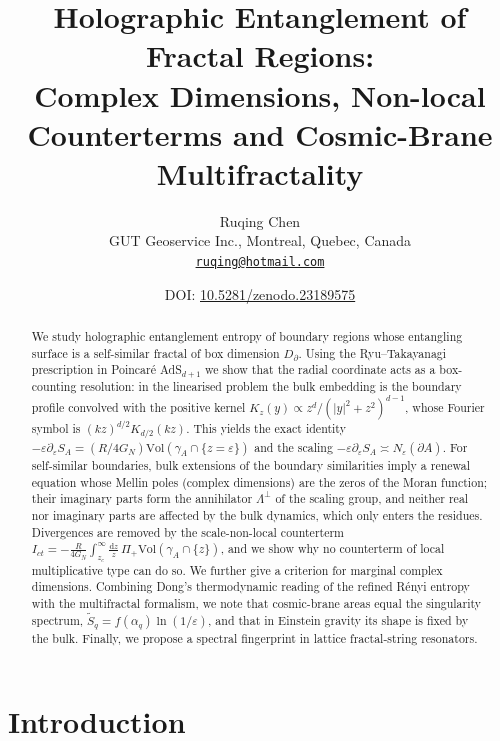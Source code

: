 \documentclass[11pt]{article}
\title{Holographic Entanglement of Fractal Regions:\\
Complex Dimensions, Non-local Counterterms and Cosmic-Brane Multifractality}
\author{Ruqing Chen\\[2pt]
\small GUT Geoservice Inc., Montreal, Quebec, Canada\\
\small \href{mailto:ruqing@hotmail.com}{\texttt{ruqing@hotmail.com}}}
\date{\small DOI: \href{https://doi.org/10.5281/zenodo.23189575}{10.5281/zenodo.23189575}}
\theoremstyle{definition}\newtheorem{definition}{Definition}[section]
\theoremstyle{remark}\newtheorem*{remark}{Remark}
\newcommand{\dd}{\mathrm{d}}
\newcommand{\Vol}{\mathrm{Vol}}
\newcommand{\GN}{G_N}
\begin{document}
\maketitle

\begin{abstract}
We study holographic entanglement entropy of boundary regions whose entangling surface is a
self-similar fractal of box dimension $D_\partial$. Using the Ryu--Takayanagi prescription in Poincar\'e
AdS$_{d+1}$ we show that the radial coordinate acts as a box-counting resolution: in the linearised
problem the bulk embedding is the boundary profile convolved with the positive kernel
$K_z(y)\propto z^d/(|y|^2+z^2)^{d-1}$, whose Fourier symbol is $(kz)^{d/2}K_{d/2}(kz)$. This yields the exact
identity $-\varepsilon\partial_\varepsilon S_A=(R/4\GN)\Vol(\gamma_A\cap\{z=\varepsilon\})$ and the scaling
$-\varepsilon\partial_\varepsilon S_A\asymp N_\varepsilon(\partial A)$.
For self-similar boundaries, bulk extensions of the boundary similarities imply a renewal equation whose
Mellin poles (complex dimensions) are the zeros of the Moran function; their imaginary parts form the
annihilator $\Lambda^\perp$ of the scaling group, and neither real nor imaginary parts are affected by
the bulk dynamics, which only enters the residues. Divergences are removed by the scale-non-local
counterterm $I_{ct}=-\frac{R}{4\GN}\int_{z_c}^{\infty}\frac{\dd z}{z}\,\Pi_{+}\Vol(\gamma_A\cap\{z\})$, and we show
why no counterterm of local multiplicative type can do so.
We further give a criterion for marginal complex dimensions. Combining Dong's thermodynamic reading of
the refined R\'enyi entropy with the multifractal formalism, we note that cosmic-brane areas equal the
singularity spectrum, $\tilde S_q=f(\alpha_q)\ln(1/\varepsilon)$, and that in Einstein gravity its shape is
fixed by the bulk. Finally, we propose a spectral fingerprint in lattice fractal-string resonators.
\end{abstract}

\tableofcontents

\section{Introduction}
\label{sec:intro}
\end{document}
